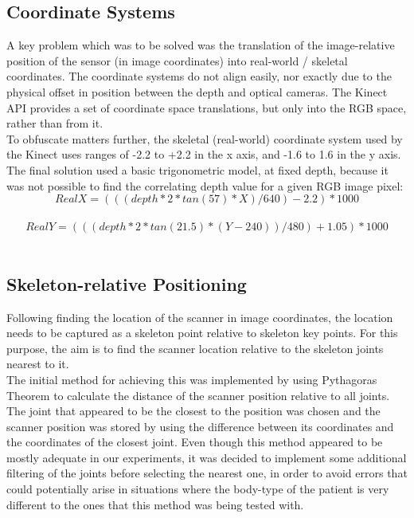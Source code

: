 \subsection{Coordinate Systems}
A key problem which was to be solved was the translation of the image-relative position of the sensor (in image coordinates) into real-world / skeletal coordinates. The coordinate systems do not align easily, nor exactly due to the physical offset in position between the depth and optical cameras. The Kinect API provides a set of coordinate space translations, but only into the RGB space, rather than from it. \\

To obfuscate matters further, the skeletal (real-world) coordinate system used by the Kinect uses ranges of -2.2 to +2.2 in the x axis, and -1.6 to 1.6 in the y axis.\\

The final solution used a basic trigonometric model, at fixed depth, because it was not possible to find the correlating depth value for a given RGB image pixel: \\

\begin{equation}
Real X = (((depth * 2 * tan(57) * X) / 640) - 2.2) * 1000
\label{Conversion of x coordinates from image into real space}
\end{equation} \\

\begin{equation}
Real Y = (((depth * 2 * tan(21.5) * (Y - 240)) / 480) + 1.05 ) * 1000
\label{Conversion of y coordinates from image into real space}
\end{equation} \\

\subsection{Skeleton-relative Positioning}
Following finding the location of the scanner in image coordinates, the location needs to be captured as a skeleton point relative to skeleton key points. For this purpose, the aim is to find the scanner location relative to the skeleton joints nearest to it.\\

The initial method for achieving this was implemented by using Pythagoras Theorem to calculate the distance of the scanner position relative to all joints. The joint that appeared to be the closest to the position was chosen and the scanner position was stored by using the difference between its coordinates and the coordinates of the closest joint. Even though this method appeared to be mostly adequate in our experiments, it was decided to implement some additional filtering of the joints before selecting the nearest one, in order to avoid errors that could potentially arise in situations where the body-type of the patient is very different to the ones that this method was being tested with.\\

